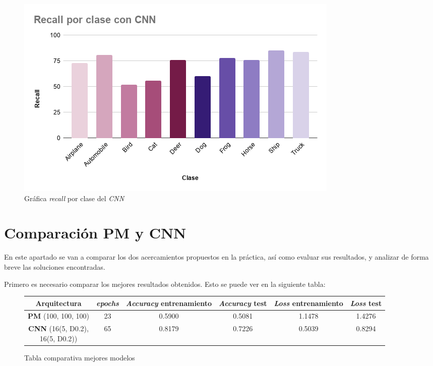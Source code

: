 \documentclass{uc3mpracticas}
\begin{document}
\begin{figure}[!h]
\centering
  \includegraphics[width=.55\linewidth]{Images/recall_clase_CNN.png}
  \caption*{Gráfica \textit{recall} por clase del \textit{CNN}}
\end{figure}




\section{Comparación PM y CNN}

En este apartado se van a comparar los dos acercamientos propuestos en la práctica, así como evaluar sus resultados, y analizar de forma breve las soluciones encontradas.

\vspace{2mm}

Primero es necesario comparar los mejores resultados obtenidos. Esto se puede ver en la siguiente tabla:


\begin{figure}[!h]
\begin{center}
  \begin{tabular}{|c|c|c|c|c|c|}
    \hline
    \rowcolor{Gray}
        \textbf{Arquitectura} & \textbf{\textit{epochs}}& \textbf{\textit{Accuracy} entrenamiento} & \textbf{\textit{Accuracy} test} & \textbf{\textit{Loss} entrenamiento} & \textbf{\textit{Loss} test}\\ \hline \hline
        \textbf{PM} (100, 100, 100)       & 23                      &  0.5900                                  &  0.5081                         &  1.1478                              &  1.4276            \\ \hline \hline
        \textbf{CNN} \makecell{(16(5, D0.2), \\ 16(5, D0.2))}& 65   &  0.8179                                  &  0.7226                         &  0.5039                              &  0.8294            \\ \hline
  \end{tabular}
\end{center}
\caption*{Tabla comparativa mejores modelos}
\end{figure}
\end{document}
